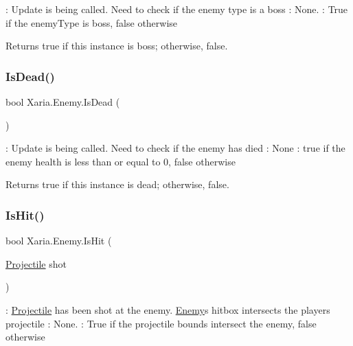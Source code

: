 \+: Update is being called. Need to check if the enemy type is a boss \+: None. \+: True if the enemy\+Type is boss, false otherwise 

\begin{DoxyReturn}{Returns}
{\ttfamily true} if this instance is boss; otherwise, {\ttfamily false}. 
\end{DoxyReturn}
\mbox{\label{classXaria_1_1Enemy_ad4a9e26e30c920fafbae59415476f281}} 
\subsubsection{\texorpdfstring{Is\+Dead()}{IsDead()}}
{\footnotesize\ttfamily bool Xaria.\+Enemy.\+Is\+Dead (\begin{DoxyParamCaption}{ }\end{DoxyParamCaption})\hspace{0.3cm}{\ttfamily [inline]}}



\+: Update is being called. Need to check if the enemy has died \+: None \+: true if the enemy health is less than or equal to 0, false otherwise 

\begin{DoxyReturn}{Returns}
{\ttfamily true} if this instance is dead; otherwise, {\ttfamily false}. 
\end{DoxyReturn}
\mbox{\label{classXaria_1_1Enemy_af2fe968a037dda0f8a17f6d218a55ac6}} 
\subsubsection{\texorpdfstring{Is\+Hit()}{IsHit()}}
{\footnotesize\ttfamily bool Xaria.\+Enemy.\+Is\+Hit (\begin{DoxyParamCaption}\item[{\hyperlink{classXaria_1_1Projectile}{Projectile}}]{shot }\end{DoxyParamCaption})\hspace{0.3cm}{\ttfamily [inline]}}



\+: \hyperlink{classXaria_1_1Projectile}{Projectile} has been shot at the enemy. \hyperlink{classXaria_1_1Enemy}{Enemy}\textquotesingle{}s hitbox intersects the player\textquotesingle{}s projectile \+: None. \+: True if the projectile bounds intersect the enemy, false otherwise 


